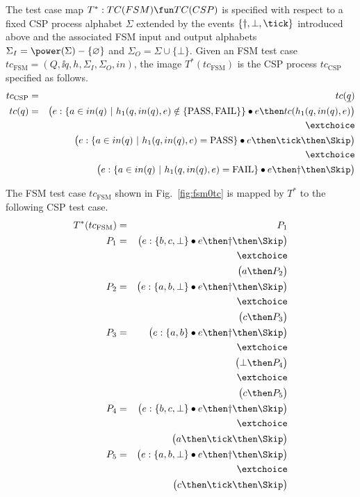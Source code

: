 The test case map $T^* :TC(FSM) \fun TC(CSP)$ is specified with respect to a fixed
CSP process alphabet $\Sigma$ extended by the events $\{\dag,\bot,\tick \}$ introduced
above
and the associated FSM input and output alphabets
$\Sigma_I = \power(\Sigma)-\{\varnothing\}$ and $\Sigma_O=\Sigma\cup \{\bot \}$.
Given an FSM test case $tc_\text{FSM}=(Q,\ii q,h,\Sigma_I,\Sigma_O,in)$, 
the image $T^*(tc_\text{FSM})$ is the CSP process $tc_\text{CSP}$ specified 
as follows.
\begin{eqnarray*}
tc_\text{CSP} & = & tc(\ii q)
\\
tc(q) & = & \big( e : \{ a\in in(q)~|~h_1(q,in(q),e)\notin \{\text{PASS},\text{FAIL}\} \} \bullet e \then tc(h_1(q,in(q),e) \big)
\\ & & \extchoice
\\ & & \big( e : \{ a\in in(q)~|~h_1(q,in(q),e) = \text{PASS} \} \bullet e \then \tick \then \Skip \big)
\\ & & \extchoice
\\ & & \big( e : \{ a\in in(q)~|~h_1(q,in(q),e) = \text{FAIL} \} \bullet e \then \dag \then \Skip \big)
\end{eqnarray*}


\begin{example}
The FSM test case $tc_\text{FSM}$
shown in Fig.~\ref{fig:fsm0tc} is mapped by $T^*$ to the following
CSP test case.
\begin{eqnarray*}
T^*(tc_\text{FSM}) & = & P_1
\\
P_1 & = & \big(e:\{ b,c,\bot \} \bullet e \then \dag\then\Skip\big)
\\ & & \extchoice
\\ & & \big( a \then P_2 \big) 
\\
P_2 & = & \big( e : \{ a,b,\bot \}\bullet e\then \dag\then\Skip  \big)
\\ & & \extchoice
\\ & & \big( c\then P_3 \big)
\\
P_3 & = & \big( e : \{ a,b \}\bullet e\then \dag\then\Skip  \big)
\\ & & \extchoice
\\ & & \big( \bot \then P_4 \big)
\\ & & \extchoice
\\ & & \big( c\then P_5 \big)
\\
P_4 & = & \big( e : \{ b,c,\bot \}\bullet e\then \dag\then\Skip  \big)
\\ & & \extchoice
\\ & &  \big( a\then\tick\then \Skip \big)
\\
P_5 & = & \big( e : \{ a,b,\bot \}\bullet e\then \dag\then\Skip  \big)
\\ & & \extchoice
\\ & & \big( c\then\tick\then \Skip \big)
\end{eqnarray*}
\xbox
\end{example}




